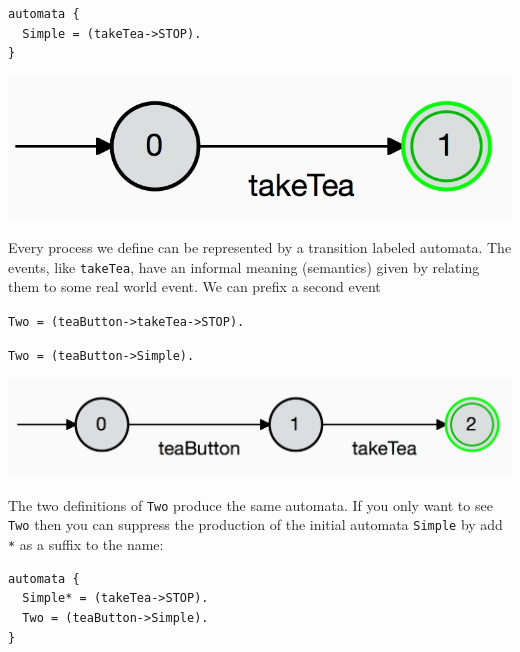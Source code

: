 \documentclass[]{article}
\begin{document}
\noindent\hspace{\fill} \begin{minipage}{0.4\textwidth}
\begin{verbatim}
automata {
  Simple = (takeTea->STOP).
}\end{verbatim}
\end{minipage}
\begin{minipage}{0.25\textwidth}\includegraphics[scale=0.15]{Simple.jpg}\end{minipage}\hspace{\fill}

\noindent  Every process we define can be represented by a transition labeled automata. The events, like  \verb$takeTea$,  have an informal meaning (semantics) given by relating them to  some  real world event. We can prefix  a second event

\noindent\begin{center}  \begin{minipage}{0.45\textwidth}
\verb$Two = (teaButton->takeTea->STOP).$

\verb$Two = (teaButton->Simple).$   \end{minipage}\begin{minipage}{0.45\textwidth}\includegraphics[scale=0.15]{Two.jpg}\end{minipage}\end{center}

The two definitions of \verb|Two| produce the same automata. If you only want to see \verb|Two| then you can suppress the production of the initial automata \verb|Simple| by add \verb|*| as a suffix to the name:

\noindent\begin{center}
\begin{minipage}{0.45\textwidth}\begin{verbatim}
automata {
  Simple* = (takeTea->STOP).
  Two = (teaButton->Simple).
}\end{verbatim} \end{minipage}
\end{center}
\end{document}

